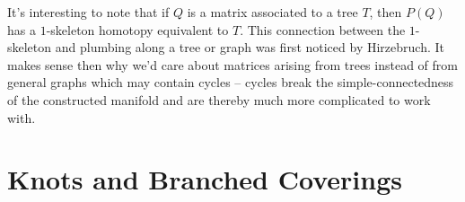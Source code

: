 It's interesting to note that if $Q$ is a matrix associated to a tree $T$, then $P(Q)$ has a $1$-skeleton homotopy equivalent to $T$. This connection between the $1$-skeleton and plumbing along a tree or graph was first noticed by Hirzebruch. It makes sense then why we'd care about matrices arising from trees instead of from general graphs which may contain cycles -- cycles break the simple-connectedness of the constructed manifold and are thereby much more complicated to work with.

\section{Knots and Branched Coverings}\label{sec:brieskorn}
\cite{milnor1968hypersurfaces}
\cite{kauffman1987knots}
